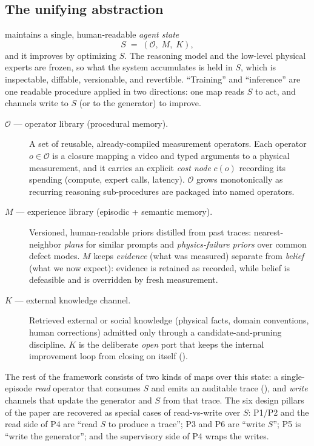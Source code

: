 \subsection{The unifying abstraction}
\label{sec:framework:abstraction}

\PhyReAct{} maintains a single, human-readable \emph{agent state}
\begin{equation}
  S \;=\; (\mathcal{O},\; M,\; K),
  \label{eq:state}
\end{equation}
and it improves by optimizing $S$. The reasoning model and the low-level physical
experts are frozen, so what the system accumulates is held in $S$, which is inspectable,
diffable, versionable, and revertible. ``Training'' and
``inference'' are one readable procedure applied in two directions: one
map reads $S$ to act, and channels write to $S$ (or to the generator) to improve.

\begin{description}
  \item[$\mathcal{O}$ --- operator library (procedural memory).] A set of reusable,
    already-compiled measurement operators. Each operator $o\in\mathcal{O}$ is a closure
    mapping a video and typed arguments to a physical measurement, and it carries
    an explicit \emph{cost node} $c(o)$ recording its spending (compute, expert
    calls, latency). $\mathcal{O}$ grows monotonically as recurring reasoning
    sub-procedures are packaged into named operators.
  \item[$M$ --- experience library (episodic + semantic memory).] Versioned,
    human-readable priors distilled from past traces: nearest-neighbor
    \emph{plans} for similar prompts and \emph{physics-failure priors} over
    common defect modes. $M$ keeps \emph{evidence} (what was measured) separate
    from \emph{belief} (what we now expect): evidence is retained as
    recorded, while belief is defeasible and is overridden by fresh measurement.
  \item[$K$ --- external knowledge channel.] Retrieved external or social
    knowledge (physical facts, domain conventions, human corrections) admitted
    only through a candidate-and-pruning discipline. $K$ is the deliberate
    \emph{open} port that keeps the internal improvement loop from closing on
    itself ().
\end{description}

The rest of the framework consists of two kinds of maps over this state: a
single-episode \emph{read} operator that consumes $S$ and emits an auditable
trace (), and \emph{write} channels that update the
generator and $S$ from that trace. The six design pillars of the paper are
recovered as special cases of read-vs-write over $S$: P1/P2 and the read side of
P4 are ``read $S$ to produce a trace''; P3 and P6 are ``write $S$''; P5 is
``write the generator''; and the supervisory side of P4 wraps the writes.

